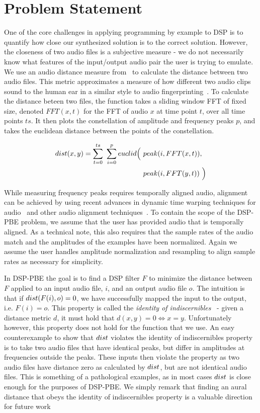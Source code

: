 
\section{Problem Statement}

One of the core challenges in applying programming by example to DSP is to quantify how close our synthesized solution is to the correct solution.
However, the closeness of two audio files is a subjective measure - we do not necessarily know what features of the input/output audio pair the user is trying to emulate.
We use an audio distance measure from~\cite{SantolucitoFARM} to calculate the distance between two audio files.
This metric approximates a measure of how different two audio clips sound to the human ear in a similar style to audio fingerprinting~\cite{wang2003industrial,fingerprinting}.
To calculate the distance beteen two files, the function takes a sliding window FFT of fixed size, denoted $FFT(x,t)$ for the FFT of audio $x$ at time point $t$, over all time points $ts$.
It then plots the constellation of amplitude and frequency peaks $p$, and takes the euclidean distance between the points of the constellation.

%
\begin{align*}
\distFxn(x,y) =  \sum_{t=0}^{ts}\ \sum_{i=0}^{p} euclid\Big(\ &peak(i,FFT(x,t)), \\ &peak(i,FFT(y,t))\ \Big)
\end{align*}
%

While measuring frequency peaks requires temporally aligned audio, alignment can be achieved by using recent advances in dynamic time warping techniques for audio~\cite{carabias2015audio} and other audio alignment techniques~\cite{ArztL18}.
To contain the scope of the DSP-PBE problem, we assume that the user has provided audio that is temporally aligned.
As a technical note, this also requires that the sample rates of the audio match and the amplitudes of the examples have been normalized.
Again we assume the user handles amplitude normalization and resampling to align sample rates as necessary for simplicity.

In DSP-PBE the goal is to find a DSP filter $F$ to minimize the distance between $F$ applied to an input audio file, $i$, and an output audio file $o$.
The intuition is that if $dist(F(i),o) = 0$, we have successfully mapped the input to the output, i.e. $F(i) = o$.
This property is called the \textit{identity of indiscernibles}~\cite{frechet1906quelques} - given a distance metric $d$, it must hold that $d(x,y) = 0 \Leftrightarrow x = y$.
Unfortunately however, this property does not hold for the \distFxn function that we use.
An easy counterexample to show that $dist$ violates the identity of indiscernibles property is to take two audio files that have identical peaks, but differ in amplitudes at frequencies outside the peaks.
These inputs then violate the property as two audio files have distance zero as calculated by $dist$, but are not identical audio files.
This is something of a pathological examples, as in most cases $dist$ is close enough for the purposes of DSP-PBE.
We simply remark that finding an aural distance that obeys the identity of indiscernibles property is a valuable direction for future work 

